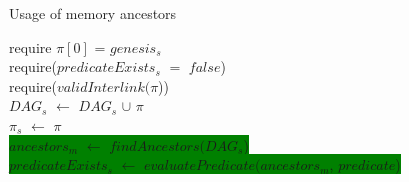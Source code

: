 \begin{algorithm}[H]
    \caption{Usage of memory ancestors}
    \label{algorithm:ancestors_in_memory}
    require $\pi[0]$ = $genesis_{s}$ \\
    require($predicateExists_{s}$ $=$ $false$) \\
    require($validInterlink(\pi$))\\
    $DAG_{s}$ $\leftarrow$ $DAG_{s}$ $\cup$ $\pi$\\
    $\pi_{s}$ $\leftarrow$ $\pi$\\
    \colorbox{green}{$ancestors_{m}$ $\leftarrow$ $findAncestors(DAG_{s}$)} \\
    \colorbox{green}{$predicateExists_{s}$ $\leftarrow$
    $evaluatePredicate(ancestors_{m}$, $predicate$)} \\
\end{algorithm}
